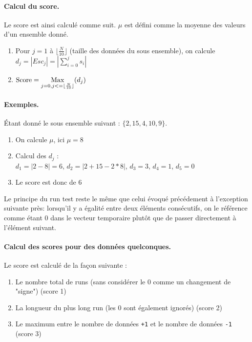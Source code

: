 \paragraph{Calcul du score.\\}
Le score est ainsi calculé comme suit. $\mu$ est défini comme la moyenne des valeurs d'un ensemble donné.
\begin{enumerate}
\item Pour $j=1$ à $ \lfloor\frac{N}{10}\rfloor$ (taille des données du sous ensemble), on calcule $d_j=|Esc_j| = |\sum\limits_{i=0}^{j} s_i|$
\item $\text{Score} = \operatorname*{Max}\limits_{j=0,j<=\lfloor\frac{N}{10}\rfloor} (d_j)$
\end{enumerate}

\paragraph{Exemples.\\}
Étant donné le sous ensemble suivant : $ \lbrace 2, 15, 4, 10, 9 \rbrace$. 
\begin{enumerate}
\item On calcule $\mu$, ici $\mu=8$
\item Calcul des $d_j$ :\\
$d_1=|2-8|=6$, $d_2=|2+15-2*8|$, $d_3=3$, $d_4=1$, $d_5=0$
\item Le score est donc de $6$\\
\end{enumerate}

Le principe du run test reste le même que celui évoqué précédement à l'exception suivante près:  lorsqu'il y a égalité entre deux éléments consécutifs, on le référence comme étant 0 dans le vecteur temporaire plutôt que de passer directement à l'élément suivant. 

\paragraph{Calcul des scores pour des données quelconques.\\}
Le score est calculé de la façon suivante : 
\begin{enumerate}
\item Le nombre total de runs (sans considérer le 0 comme un changement de "signe") (score 1)
\item La longueur du plus long run (les 0 sont également ignorés)  (score 2)
\item Le maximum entre le nombre de données \texttt{+1} et le nombre de données \texttt{-1} (score 3)\\

\end{enumerate}


